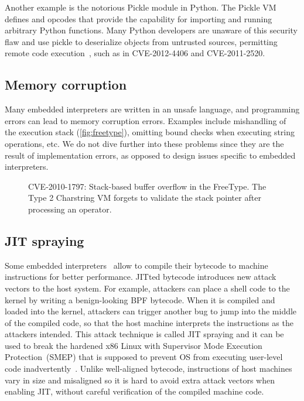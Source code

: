 Another example is the notorious Pickle module in Python.  The
Pickle VM defines  and  opcodes that
provide the capability for importing and running arbitrary Python
functions. Many Python developers are unaware of this security
flaw and use pickle to deserialize objects from untrusted sources,
permitting remote code execution~\cite{pickle:wp}, such as in 
CVE-2012-4406 and CVE-2011-2520.


\subsection{Memory corruption}

Many embedded interpreters are written in an unsafe language, and programming errors can
lead to memory corruption errors. Examples include mishandling of the execution
stack (\autoref{fig:freetype}), omitting bound checks when executing string
operations, etc.  We do not dive further into these problems since they are the
result of implementation errors, as opposed to design issues specific to
embedded interpreters.

\begin{figure}
\centering

\coderule
\caption{
CVE-2010-1797:
Stack-based buffer overflow in the FreeType. 
The Type 2 Charstring VM forgets to
validate the stack pointer after processing an operator. }
\label{fig:freetype}
\end{figure}


\subsection{JIT spraying}

Some embedded interpreters~\cite{mccanne:bpf,clamav:llvm} allow to
compile their bytecode to machine instructions for better performance.
JITted bytecode introduces new attack vectors to the host system.
For example, attackers
can place a shell code to the kernel by writing a benign-looking BPF
bytecode. When it is compiled and loaded into the kernel, attackers can trigger
another bug to jump into the middle of the compiled code, so that the host
machine interprets the instructions as the attackers intended. This attack
technique is called JIT spraying and it can be used to break the hardened x86
Linux with Supervisor Mode Execution Protection~(SMEP) that is supposed to
prevent OS from executing user-level code
inadvertently~\cite{mcaalister:jit}. Unlike well-aligned bytecode, instructions
of host machines vary in size and misaligned so it is hard to avoid extra attack
vectors when enabling JIT, without careful verification of the
compiled machine code.
